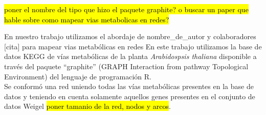 \hl{poner el nombre del tipo que hizo el paquete graphite? o buscar un paper que hable sobre como mapear vias metabolicas en redes?}

En nuestro trabajo utilizamos el abordaje de nombre_de_autor y colaboradores [cita] para mapear vias metabólicas en redes
En este trabajo utilizamos la base de datos KEGG de vías metabólicas de la planta \textit{Arabidospsis thaliana} disponible a través del paquete ``graphite'' (GRAPH Interaction from pathway Topological Environment) del lenguaje de programación R.\\


Se conformó una red uniendo todas las vías metabólicas presentes en la base de datos y teniendo en cuenta solamente aquellos genes presentes en el conjunto de datos Weigel \hl{poner tamanio de la red, nodos y arcos}.
\cite{Segal2003}\cite{Kanehisa2000}
